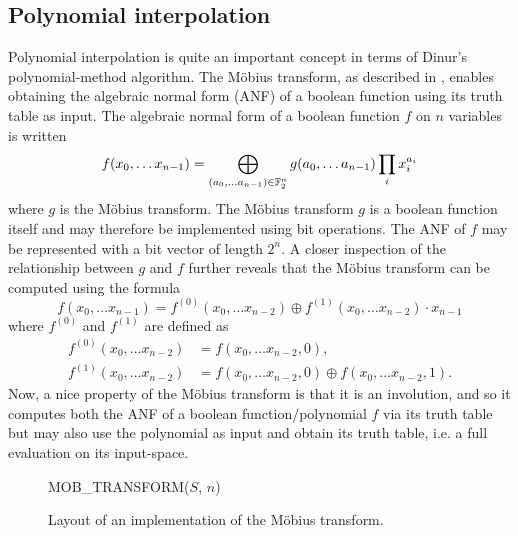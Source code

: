 \subsection{Polynomial interpolation} \label{sec:prereq:poly_interp}
Polynomial interpolation is quite an important concept in terms of Dinur's polynomial-method algorithm. The Möbius transform, as described in \cite{joux2009algorithmic}, enables obtaining the algebraic normal form (ANF) of a boolean function using its truth table as input. The algebraic normal form of a boolean function $f$ on $n$ variables is written
$$
    f(x_0, \dots x_{n - 1}) = \bigoplus_{(a_0,\dots a_{n - 1}) \in \mathbb{F}_2^n} g(a_0, \dots a_{n - 1}) \prod_i x_i^{a_i}
$$
where $g$ is the Möbius transform. The Möbius transform $g$ is a boolean function itself and may therefore be implemented using bit operations. The ANF of $f$ may be represented with a bit vector of length $2^n$. A closer inspection of the relationship between $g$ and $f$ further reveals that the Möbius transform can be computed using the formula
$$
    f(x_0, \dots x_{n - 1}) = f^{(0)}(x_0, \dots x_{n - 2}) \oplus f^{(1)}(x_0, \dots x_{n - 2}) \cdot x_{n - 1}
$$
where $f^{(0)}$ and $f^{(1)}$ are defined as 
\begin{equation*}
    \begin{split}
        f^{(0)}(x_0, \dots x_{n - 2}) &= f(x_0, \dots x_{n - 2}, 0), \\
        f^{(1)}(x_0, \dots x_{n - 2}) &= f(x_0, \dots x_{n - 2}, 0) \oplus f(x_0, \dots x_{n - 2}, 1).
    \end{split}
\end{equation*}
Now, a nice property of the Möbius transform is that it is an involution, and so it computes both the ANF of a boolean function/polynomial $f$ via its truth table but may also use the polynomial as input and obtain its truth table, i.e. a full evaluation on its input-space.

\begin{figure}[ht]
    \begin{alg}
        \caption{MOB\_TRANSFORM($S$, $n$)}
    \end{alg}
    \caption{Layout of an implementation of the Möbius transform.}
    \label{alg:mob}
\end{figure}

